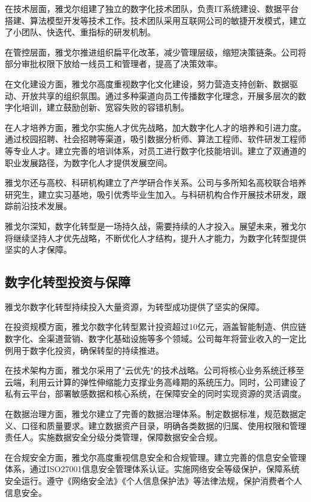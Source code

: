 \documentclass[12pt,a4paper]{article}
\begin{document}
在技术层面，雅戈尔组建了独立的数字化技术团队，负责IT系统建设、数据平台搭建、算法模型开发等技术工作。技术团队采用互联网公司的敏捷开发模式，建立了小团队、快迭代、重指标的研发机制。

在管控层面，雅戈尔推进组织扁平化改革，减少管理层级，缩短决策链条。公司将部分审批权限下放给一线员工和管理者，提高了决策效率。

在文化建设方面，雅戈尔高度重视数字化文化建设，努力营造支持创新、数据驱动、开放共享的组织氛围。通过多种渠道向员工传播数字化理念，开展多层次的数字化培训，建立鼓励创新、宽容失败的容错机制。

在人才培养方面，雅戈尔实施人才优先战略，加大数字化人才的培养和引进力度。通过校园招聘、社会招聘等渠道，吸引数据分析师、算法工程师、软件研发工程师等专业人才。建立完善的培训体系，对员工进行数字化技能培训。建立了双通道的职业发展路径，为数字化人才提供发展空间。

雅戈尔还与高校、科研机构建立了产学研合作关系。公司与多所知名高校联合培养研究生，建立实习基地，吸引优秀毕业生加入。与科研机构合作开展技术研发，跟踪前沿技术发展。

雅戈尔深知，数字化转型是一场持久战，需要持续的人才投入。展望未来，雅戈尔将继续坚持人才优先战略，不断优化人才结构，提升人才能力，为数字化转型提供坚实的人才保障。

\subsection{数字化转型投资与保障}

雅戈尔数字化转型持续投入大量资源，为转型成功提供了坚实的保障。

在投资规模方面，雅戈尔数字化转型累计投资超过10亿元，涵盖智能制造、供应链数字化、全渠道营销、数字化基础设施等多个领域。公司每年将营业收入的一定比例用于数字化投资，确保转型的持续推进。

在技术架构方面，雅戈尔采用了"云优先"的技术战略。公司将核心业务系统迁移至云端，利用云计算的弹性伸缩能力支撑业务高峰期的系统压力。同时，公司建设了私有云平台，部署敏感数据和核心系统，在保障安全的同时实现资源的灵活调度。

在数据治理方面，雅戈尔建立了完善的数据治理体系。制定数据标准，规范数据定义、口径和质量要求。建立数据资产目录，明确各类数据的归属、使用权限和管理责任人。实施数据安全分级分类管理，保障数据安全合规。

在合规安全方面，雅戈尔高度重视信息安全和合规管理。建立完善的信息安全管理体系，通过ISO27001信息安全管理体系认证。实施网络安全等级保护，保障系统安全运行。遵守《网络安全法》《个人信息保护法》等法律法规，保护消费者个人信息安全。
\end{document}
